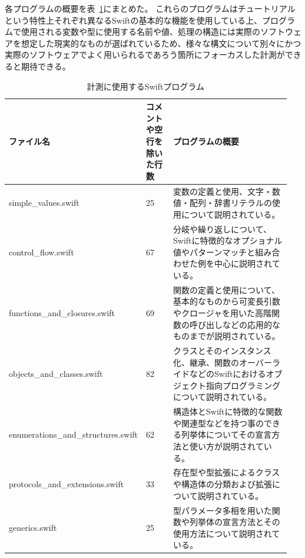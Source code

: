 各プログラムの概要を表~\ref{table:measure-sample-programs}にまとめた。
これらのプログラムはチュートリアルという特性上それぞれ異なるSwiftの基本的な機能を使用している上、プログラムで使用される変数や型に使用する名前や値、処理の構造には実際のソフトウェアを想定した現実的なものが選ばれているため、様々な構文について別々にかつ実際のソフトウェアでよく用いられるであろう箇所にフォーカスした計測ができると期待できる。

\begin{table}[!hbtp]
    \begin{center}
        \caption{計測に使用するSwiftプログラム}
        \begin{tabular}{|p{0.4\linewidth}|p{0.1\linewidth}|p{0.45\linewidth}|}
            \hline
            ファイル名 & コメントや空行を除いた行数 & プログラムの概要\\
            \hline
            \hline
            simple\_values.swift & 25 & 変数の定義と使用、文字・数値・配列・辞書リテラルの使用について説明されている。\\
            \hline
            control\_flow.swift & 67 & 分岐や繰り返しについて、Swiftに特徴的なオプショナル値やパターンマッチと組み合わせた例を中心に説明されている。\\
            \hline
            functions\_and\_closures.swift & 69 & 関数の定義と使用について、基本的なものから可変長引数やクロージャを用いた高階関数の呼び出しなどの応用的なものまでが説明されている。\\
            \hline
            objects\_and\_classes.swift & 82 & クラスとそのインスタンス化、継承、関数のオーバーライドなどのSwiftにおけるオブジェクト指向プログラミングについて説明されている。\\
            \hline
            enumerations\_and\_structures.swift & 62 & 構造体とSwiftに特徴的な関数や関連型などを持つ事のできる列挙体についてその宣言方法と使い方が説明されている。\\
            \hline
            protocols\_and\_extensions.swift & 33 & 存在型や型拡張によるクラスや構造体の分類および拡張について説明されている。\\
            \hline
            generics.swift & 25 & 型パラメータ多相を用いた関数や列挙体の宣言方法とその使用方法について説明されている。\\
            \hline
        \end{tabular}
        \label{table:measure-sample-programs}
    \end{center}
\end{table}

